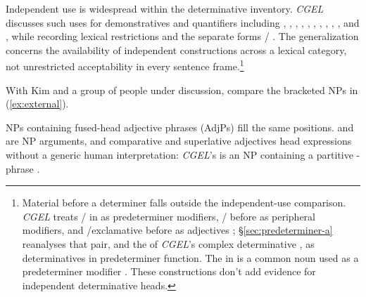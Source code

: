 \documentclass[12pt]{article}
\begin{document}
Independent use is widespread within the determinative inventory. \textit{CGEL} discusses such uses for demonstratives and quantifiers including , , , , , , , , , , and , while recording lexical restrictions and the separate forms / \citep[371--372, 410--424]{huddleston2002}. The generalization concerns the availability of independent constructions across a lexical category, not unrestricted acceptability in every sentence frame.\footnote{Material before a determiner falls outside the independent-use comparison. \textit{CGEL} treats / in  as predeterminer modifiers, / before  as peripheral modifiers, and /exclamative  before  as adjectives \citep[433--437]{huddleston2002}; §\ref{sec:predeterminer-a} reanalyses that pair, and the  of \textit{CGEL}'s complex determinative  \citep[394]{huddleston2002}, as determinatives in predeterminer function. The  in  is a common noun used as a predeterminer modifier \citep[434]{huddleston2002}. These constructions don't add evidence for independent determinative heads.}

With Kim and a group of people under discussion, compare the bracketed NPs in (\ref{ex:external}).

\begin{samepage}

\ea\label{ex:external}
\ea {}\qquad {}\qquad {}
\ex {}\qquad {}\qquad {}
\ex {}\qquad {}\qquad {}
\ex {}\qquad {}\qquad {}
\z\z

\end{samepage}

NPs containing fused-head adjective phrases (AdjPs) fill the same positions.  and  are NP arguments, and comparative and superlative adjectives head expressions without a generic human interpretation: \textit{CGEL}'s  is an NP containing a partitive -phrase \citep[332--333, 416--423]{huddleston2002}.
\end{document}
